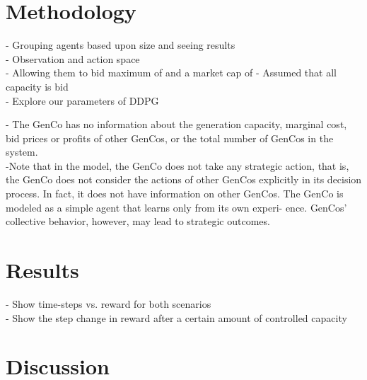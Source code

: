 \documentclass[conference]{IEEEtran}
\begin{document}





\section{Methodology}
\label{sec:methodology}

- Grouping agents based upon size and seeing results\\
- Observation and action space \\
- Allowing them to bid maximum of  and a market cap of 
- Assumed that all capacity is bid\\
- Explore our parameters of DDPG

- The GenCo has no information about the generation capacity, marginal cost, bid prices or profits of other GenCos, or the total number of GenCos in the system. \cite{EsmaeiliAliabadi2017}\\



-Note that in the model, the GenCo does not take any strategic action, that is, the GenCo does not consider the actions of other GenCos explicitly in its decision process. In fact, it does not have information on other GenCos. The GenCo is modeled as a simple agent that learns only from its own experi- ence. GenCos’ collective behavior, however, may lead to strategic outcomes.\cite{EsmaeiliAliabadi2017}\\


\section{Results}
\label{sec:results}

- Show time-steps vs. reward for both scenarios \\
- Show the step change in reward after a certain amount of controlled capacity

\section{Discussion}
\label{sec:discussion}
\end{document}
